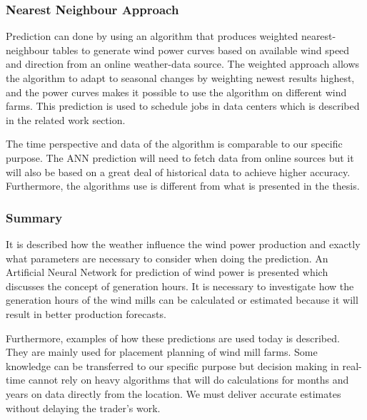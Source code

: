 \subsubsection{Nearest Neighbour Approach}
Prediction can done by using an algorithm that produces weighted nearest-neighbour tables to generate wind power curves based on available wind speed and direction from an online weather-data source. The weighted approach allows the algorithm to adapt to seasonal changes by weighting newest results highest, and the power curves makes it possible to use the algorithm on different wind farms. This prediction is used to schedule jobs in data centers which is described in the related work section.

The time perspective and data of the algorithm is comparable to our specific purpose. The ANN prediction will need to fetch data from online sources but it will also be based on a great deal of historical data to achieve higher accuracy. Furthermore, the algorithms use is different from what is presented in the thesis. 

\subsubsection{Summary}
It is described how the weather influence the wind power production and exactly what parameters are necessary to consider when doing the prediction. An Artificial Neural Network for prediction of wind power is presented which discusses the concept of generation hours. It is necessary to investigate how the generation hours of the wind mills can be calculated or estimated because it will result in better production forecasts. 

Furthermore, examples of how these predictions are used today is described. They are mainly used for placement planning of wind mill farms. Some knowledge can be transferred to our specific purpose but decision making in real-time cannot rely on heavy algorithms that will do calculations for months and years on data directly from the location. We must deliver accurate estimates without delaying the trader's work. 